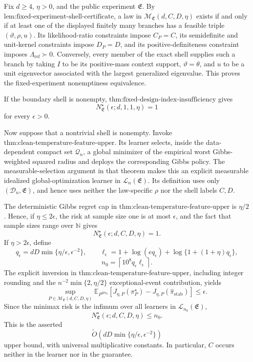Fix \(d\ge4\), \(\eta>0\), and the public experiment \(\mathfrak E\). By \(\text{lem:fixed-experiment-shell-certificate}\), a law in \(\mathcal M_{\mathfrak E}(d,C,D,\eta)\) exists if and only if at least one of the displayed finitely many branches has a feasible triple \((\vartheta,\rho,u)\). Its likelihood-ratio constraints impose \(C_P=C\), its semidefinite and unit-kernel constraints impose \(D_P=D\), and its positive-definiteness constraint imposes \(\Lambda_{\mathrm{ref}}\succ0\). Conversely, every member of the exact shell supplies such a branch by taking \(I\) to be its positive-mass context support, \(\vartheta=\theta\), and \(u\) to be a unit eigenvector associated with the largest generalized eigenvalue. This proves the fixed-experiment nonemptiness equivalence.

If the boundary shell is nonempty, \(\text{thm:fixed-design-index-insufficiency}\) gives
\[
N^\star_{\mathfrak E}(\epsilon;d,1,1,\eta)=1
\]
for every \(\epsilon>0\).

Now suppose that a nontrivial shell is nonempty. Invoke \(\text{thm:clean-temperature-feature-upper}\). Its learner selects, inside the data-dependent compact set \(\mathcal Q_n\), a global minimizer of the empirical worst Gibbs-weighted squared radius and deploys the corresponding Gibbs policy. The measurable-selection argument in that theorem makes this an explicit measurable idealized global-optimization learner in \(\mathcal L_n(\mathfrak E)\). Its definition uses only \((\mathcal D_n,\mathfrak E)\), and hence uses neither the law-specific \(\rho\) nor the shell labels \(C,D\).

The deterministic Gibbs regret cap in \(\text{thm:clean-temperature-feature-upper}\) is \(\eta/2\). Hence, if \(\eta\le2\epsilon\), the risk at sample size one is at most \(\epsilon\), and the fact that sample sizes range over \(\mathbb N\) gives
\[
N^\star_{\mathfrak E}(\epsilon;d,C,D,\eta)=1.
\]
If \(\eta>2\epsilon\), define
\[
q_\epsilon=dD\min\{\eta/\epsilon,\epsilon^{-2}\},
\qquad
\ell_\epsilon=1+\log(eq_\epsilon)+\log\{1+(1+\eta)q_\epsilon\},
\]
\[
n_0=\left\lceil10^8q_\epsilon\ell_\epsilon\right\rceil.
\]
The explicit inversion in \(\text{thm:clean-temperature-feature-upper}\), including integer rounding and the \(n^{-2}\min\{2,\eta/2\}\) exceptional-event contribution, yields
\[
\sup_{P\in\mathcal M_{\mathfrak E}(d,C,D,\eta)}
\mathbb E_{P^{\otimes n_0}}
\left[J_{\eta,P}(\pi_P^\star)-J_{\eta,P}(\widehat\pi_{\mathrm{stab}})\right]
\le\epsilon.
\]
Since the minimax risk is the infimum over all learners in \(\mathcal L_{n_0}(\mathfrak E)\),
\[
N^\star_{\mathfrak E}(\epsilon;d,C,D,\eta)\le n_0.
\]
This is the asserted
\[
\widetilde O\!\left(dD\min\{\eta/\epsilon,\epsilon^{-2}\}\right)
\]
upper bound, with universal multiplicative constants. In particular, \(C\) occurs neither in the learner nor in the guarantee.

